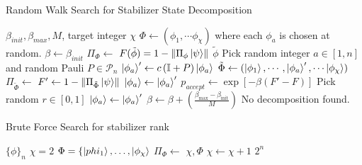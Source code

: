 \begin{algorithm}[p]
\caption{Random Walk Search for Stabilizer State Decomposition}
\label{alg:random_walk}
\begin{algorithmic}[1]
\Require $\beta_{init},\beta_{max},M$, target integer $\chi$
\Require {} 
\State $\Phi \leftarrow \left(\phi_{1},\cdots\phi_{\chi}\right)$ where each $\phi_{a}$ is chosen at random.
\State $\beta \leftarrow \beta_{init}$
        \State $\Pi_{\Phi}\gets$
        \State $F(\tilde{\phi})= 1-\norm{\Pi_{\phi}\ket{\psi}}$
            \State \Return $\tilde{\phi}$
        \EndIf
        \State Pick random integer $a\in[1,n]$ and random Pauli $P\in\mathcal{P}_{n}$
        \State $\ket{\phi_{a}}'\leftarrow c\left(\mathbb{I}+P\right)\ket{\phi_{a}}$ 
        \State $\tilde{\Phi} \leftarrow (\ket{\phi_{1}},\cdots,\ket{\phi_{a}}',\cdots\ket{\phi_{\chi}})$
        \State $\Pi_{\tilde{\Phi}}\gets$
        \State $F'\gets 1-\norm{\Pi_{\tilde{\Phi}}\ket{\psi}}$
            \State $\ket{\phi_{a}}\leftarrow \ket{\phi_{a}}'$
        \Else
            \State $p_{accept}\leftarrow \exp[-\beta\left(F'-F\right)]$
            \State Pick random $r\in [0,1]$
                \State $\ket{\phi_{a}}\leftarrow \ket{\phi_{a}}'$
            \EndIf
        \EndIf
    \EndFor
    \State $\beta\leftarrow \beta + \left( \frac{\beta_{\mathrm{max}}-\beta_{\mathrm{init}} }{M} \right)$
\EndWhile
\State \Return No decomposition found.
\end{algorithmic}
\end{algorithm}
\begin{algorithm}[p]
\caption{Brute Force Search for stabilizer rank}
\label{alg:brute_force}
\begin{algorithmic}[1]
    \Require $\{\phi\}_{n}$ 
    \Require {} 
    \State $\chi=2$
        \For $\Phi=\{\ket{phi_{1}},\dots,\ket{\phi_{\chi}}$ 
            \State $\Pi_{\Phi}\leftarrow$ 
                \State \Return $\chi,\Phi$
            \EndIf
        \EndFor
    \State $\chi\leftarrow \chi+1$
    \EndWhile
    \State \Return $2^{n}$ 
\end{algorithmic}
\end{algorithm}
